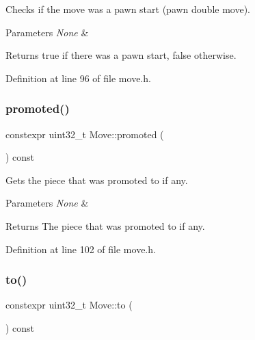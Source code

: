 Checks if the move was a pawn start (pawn double move). 


\begin{DoxyParams}{Parameters}
{\em None} & \\
\hline
\end{DoxyParams}
\begin{DoxyReturn}{Returns}
true if there was a pawn start, false otherwise. 
\end{DoxyReturn}


Definition at line 96 of file move.\+h.

\mbox{\label{classMove_a68741632b4a38ae64152541ed3c641ae}} 
\subsubsection{\texorpdfstring{promoted()}{promoted()}}
{\footnotesize\ttfamily constexpr uint32\+\_\+t Move\+::promoted (\begin{DoxyParamCaption}{ }\end{DoxyParamCaption}) const\hspace{0.3cm}{\ttfamily [inline]}}



Gets the piece that was promoted to if any. 


\begin{DoxyParams}{Parameters}
{\em None} & \\
\hline
\end{DoxyParams}
\begin{DoxyReturn}{Returns}
The piece that was promoted to if any. 
\end{DoxyReturn}


Definition at line 102 of file move.\+h.

\mbox{\label{classMove_a14f68402d1ad19b441730a7f7d703362}} 
\subsubsection{\texorpdfstring{to()}{to()}}
{\footnotesize\ttfamily constexpr uint32\+\_\+t Move\+::to (\begin{DoxyParamCaption}{ }\end{DoxyParamCaption}) const\hspace{0.3cm}{\ttfamily [inline]}}



